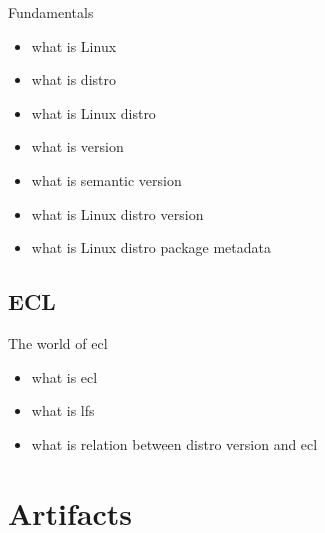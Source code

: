 \documentclass{beamer}
\begin{document}
\begin{frame}{Fundamentals}
    \begin{itemize}
        \item what is Linux
        \item what is distro
        \item what is Linux distro
        \item what is version
        \item what is semantic version
        \item what is Linux distro version
        \item what is Linux distro package metadata
    \end{itemize}
\end{frame}


\subsection{ECL}

\begin{frame}{The world of ecl}
    \begin{itemize}
        \item what is ecl
        \item what is lfs
        \item what is relation between distro version and ecl
    \end{itemize}
\end{frame}

\section{Artifacts}
\end{document}
